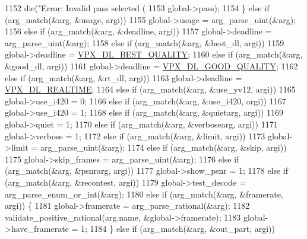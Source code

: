 \begin{DoxyCodeInclude}
{{{{{{{{{{{{{{{{{{{{{{{{{{{{{{{1152         die(\textcolor{stringliteral}{"Error: Invalid pass selected (%
1153             global->pass);
1154     \} \textcolor{keywordflow}{else} \textcolor{keywordflow}{if} (arg\_match(&arg, &usage, argi))
1155       global->usage = arg\_parse\_uint(&arg);
1156     \textcolor{keywordflow}{else} \textcolor{keywordflow}{if} (arg\_match(&arg, &deadline, argi))
1157       global->deadline = arg\_parse\_uint(&arg);
1158     \textcolor{keywordflow}{else} \textcolor{keywordflow}{if} (arg\_match(&arg, &best\_dl, argi))
1159       global->deadline = \hyperlink{group__encoder_gab350573bea112f2fdf8e5677db3ac0da}{VPX\_DL\_BEST\_QUALITY};
1160     \textcolor{keywordflow}{else} \textcolor{keywordflow}{if} (arg\_match(&arg, &good\_dl, argi))
1161       global->deadline = \hyperlink{group__encoder_ga5d00a9f9e10b9f49ca91e72c1f01c9fd}{VPX\_DL\_GOOD\_QUALITY};
1162     \textcolor{keywordflow}{else} \textcolor{keywordflow}{if} (arg\_match(&arg, &rt\_dl, argi))
1163       global->deadline = \hyperlink{group__encoder_ga04253cc9ec1146d72fa8bb86bcf32144}{VPX\_DL\_REALTIME};
1164     \textcolor{keywordflow}{else} \textcolor{keywordflow}{if} (arg\_match(&arg, &use\_yv12, argi))
1165       global->use\_i420 = 0;
1166     \textcolor{keywordflow}{else} \textcolor{keywordflow}{if} (arg\_match(&arg, &use\_i420, argi))
1167       global->use\_i420 = 1;
1168     \textcolor{keywordflow}{else} \textcolor{keywordflow}{if} (arg\_match(&arg, &quietarg, argi))
1169       global->quiet = 1;
1170     \textcolor{keywordflow}{else} \textcolor{keywordflow}{if} (arg\_match(&arg, &verbosearg, argi))
1171       global->verbose = 1;
1172     \textcolor{keywordflow}{else} \textcolor{keywordflow}{if} (arg\_match(&arg, &limit, argi))
1173       global->limit = arg\_parse\_uint(&arg);
1174     \textcolor{keywordflow}{else} \textcolor{keywordflow}{if} (arg\_match(&arg, &skip, argi))
1175       global->skip\_frames = arg\_parse\_uint(&arg);
1176     \textcolor{keywordflow}{else} \textcolor{keywordflow}{if} (arg\_match(&arg, &psnrarg, argi))
1177       global->show\_psnr = 1;
1178     \textcolor{keywordflow}{else} \textcolor{keywordflow}{if} (arg\_match(&arg, &recontest, argi))
1179       global->test\_decode = arg\_parse\_enum\_or\_int(&arg);
1180     \textcolor{keywordflow}{else} \textcolor{keywordflow}{if} (arg\_match(&arg, &framerate, argi)) \{
1181       global->framerate = arg\_parse\_rational(&arg);
1182       validate\_positive\_rational(arg.name, &global->framerate);
1183       global->have\_framerate = 1;
1184     \} \textcolor{keywordflow}{else} \textcolor{keywordflow}{if} (arg\_match(&arg, &out\_part, argi))
}}}}}}}}}}}}}}}}}}}}}}}}}}}}}}}}
\end{DoxyCodeInclude}
